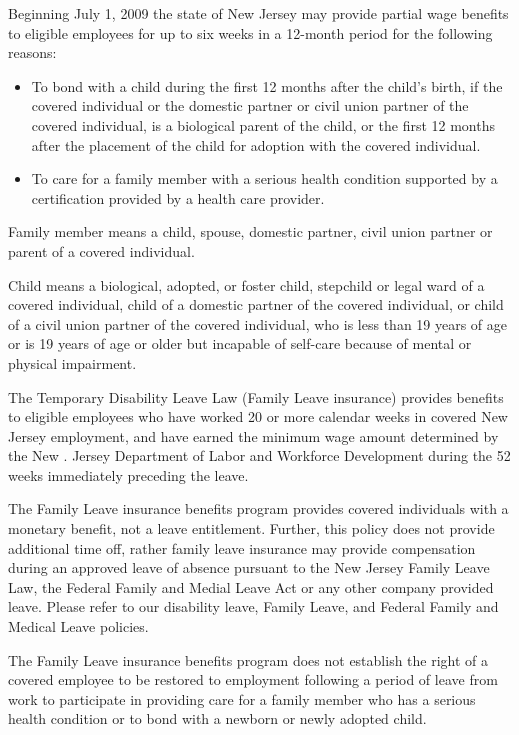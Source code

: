 Beginning July 1, 2009 the state of New Jersey may provide partial wage benefits to eligible employees for up to six weeks in a 12-month period for the following reasons:

\begin{itemize} 	\item To bond with a child during the first 12 months 	after the child's birth, if the covered individual or 	the domestic partner or civil union partner of the 	covered individual, is a biological parent of the 	child, or the first 12 months after the placement 	of the child for adoption with the covered 	individual.
	
	\item To care for a family member with a serious 	health condition supported by a certification 	provided by a health care provider. \end{itemize}

Family member means a child, spouse, domestic partner, civil union partner or parent of a covered individual.

Child means a biological, adopted, or foster child, stepchild or legal ward of a covered individual, child of a domestic partner of the covered individual, or child of a civil union partner of the covered individual, who is less than 19 years of age or is 19 years of age or older but incapable of self-care because of mental or physical impairment.

The Temporary Disability Leave Law (Family Leave insurance) provides benefits to eligible employees who have worked 20 or more calendar weeks in covered New Jersey employment, and have earned the minimum wage amount determined by the New . Jersey Department of Labor and Workforce Development during the 52 weeks immediately preceding the leave.

The Family Leave insurance benefits program provides covered individuals with a monetary benefit, not a leave entitlement. Further, this policy does not provide additional time off, rather family leave insurance may provide compensation during an approved leave of absence pursuant to the New Jersey Family Leave Law, the Federal Family and Medial Leave Act or any other company provided leave. Please refer to our disability leave, Family Leave, and Federal Family and Medical Leave policies.

The Family Leave insurance benefits program does not establish the right of a covered employee to be restored to employment following a period of leave from work to participate in providing care for a family member who has a serious health condition or to bond with a newborn or newly adopted child.

